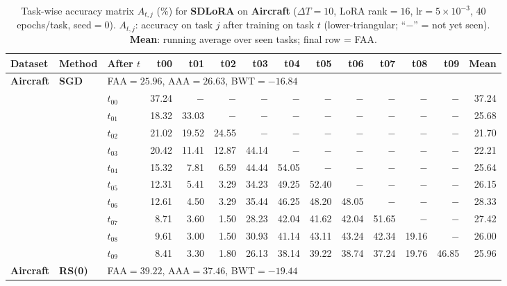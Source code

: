 \begin{table}[ht]
\centering
\caption{%
  Task-wise accuracy matrix $A_{t,j}$ (\%) for \textbf{SDLoRA} on \textbf{Aircraft} ($\Delta T=10$, LoRA rank$=16$, lr$=5\times10^{-3}$, 40 epochs/task, seed$=0$).
  $A_{t,j}$: accuracy on task $j$ after training on task $t$  (lower-triangular; ``$-$'' = not yet seen).
  \textbf{Mean}: running average over seen tasks; final row = FAA.
}
\label{tab:raw_sdlora_aircraft}
\setlength{\tabcolsep}{2.8pt}
\renewcommand{\arraystretch}{0.88}
\scriptsize
\begin{tabular}{@{}l l l *{11}{r}@{}}
\toprule
\textbf{Dataset} & \textbf{Method} & \textbf{After $t$} & \textbf{t00} & \textbf{t01} & \textbf{t02} & \textbf{t03} & \textbf{t04} & \textbf{t05} & \textbf{t06} & \textbf{t07} & \textbf{t08} & \textbf{t09} & \textbf{Mean} \\
\midrule
\multirow{11}{*}{\textbf{Aircraft}} & \multirow{11}{*}{\textbf{SGD}} & \multicolumn{12}{l}{\quad\small FAA$=25.96$,\; AAA$=26.63$,\; BWT$=-16.84$} \\
 & & $t_{00}$ & 37.24 & $-$ & $-$ & $-$ & $-$ & $-$ & $-$ & $-$ & $-$ & $-$ & 37.24 \\
 & & $t_{01}$ & 18.32 & 33.03 & $-$ & $-$ & $-$ & $-$ & $-$ & $-$ & $-$ & $-$ & 25.68 \\
 & & $t_{02}$ & 21.02 & 19.52 & 24.55 & $-$ & $-$ & $-$ & $-$ & $-$ & $-$ & $-$ & 21.70 \\
 & & $t_{03}$ & 20.42 & 11.41 & 12.87 & 44.14 & $-$ & $-$ & $-$ & $-$ & $-$ & $-$ & 22.21 \\
 & & $t_{04}$ & 15.32 &  7.81 &  6.59 & 44.44 & 54.05 & $-$ & $-$ & $-$ & $-$ & $-$ & 25.64 \\
 & & $t_{05}$ & 12.31 &  5.41 &  3.29 & 34.23 & 49.25 & 52.40 & $-$ & $-$ & $-$ & $-$ & 26.15 \\
 & & $t_{06}$ & 12.61 &  4.50 &  3.29 & 35.44 & 46.25 & 48.20 & 48.05 & $-$ & $-$ & $-$ & 28.33 \\
 & & $t_{07}$ &  8.71 &  3.60 &  1.50 & 28.23 & 42.04 & 41.62 & 42.04 & 51.65 & $-$ & $-$ & 27.42 \\
 & & $t_{08}$ &  9.61 &  3.00 &  1.50 & 30.93 & 41.14 & 43.11 & 43.24 & 42.34 & 19.16 & $-$ & 26.00 \\
 & & $t_{09}$ &  8.41 &  3.30 &  1.80 & 26.13 & 38.14 & 39.22 & 38.74 & 37.24 & 19.76 & 46.85 & 25.96 \\
\midrule
\multirow{11}{*}{\textbf{Aircraft}} & \multirow{11}{*}{\textbf{RS(0)}} & \multicolumn{12}{l}{\quad\small FAA$=39.22$,\; AAA$=37.46$,\; BWT$=-19.44$} \\

\end{tabular}
\end{table}
